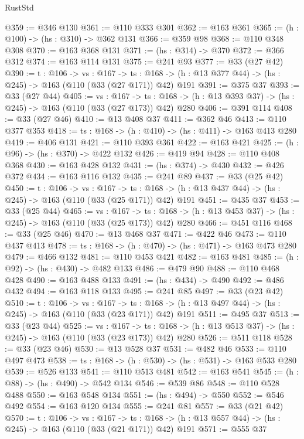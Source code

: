\begin{lexlean}{RustStd}
\begin{coremodule}
@359 := @346 @130
@361 := @110 @333 @301
@362 := @163 @361
@365 := (h : @100) -> (hs : @310) -> @362 @131
@366 := @359 @98
@368 := @110 @348 @308
@370 := @163 @368 @131
@371 := (hs : @314) -> @370
@372 := @366 @312
@374 := @163 @114 @131
@375 := @241 @93
@377 := @33 (@27 @42)
@390 := {t : @106} ->
  {vs : @167} ->
  {ts : @168} -> (h : @13 @377 @44) -> (hs : @245) -> @163 (@110 (@33 (@27 @171)) @42) @191
@391 := @375 @37
@393 := @33 (@27 @44)
@405 := {vs : @167} ->
  {ts : @168} -> (h : @13 @393 @37) -> (hs : @245) -> @163 (@110 (@33 (@27 @173)) @42) @280
@406 := @391 @114
@408 := @33 (@27 @46)
@410 := @13 @408 @37
@411 := @362 @46
@413 := @110 @377 @353
@418 := {ts : @168} -> (h : @410) -> (hs : @411) -> @163 @413 @280
@419 := @406 @131
@421 := @110 @393 @361
@422 := @163 @421
@425 := (h : @96) -> (hs : @370) -> @422 @132
@426 := @419 @94
@428 := @110 @408 @368
@430 := @163 @428 @132
@431 := (hs : @374) -> @430
@432 := @426 @372
@434 := @163 @116 @132
@435 := @241 @89
@437 := @33 (@25 @42)
@450 := {t : @106} ->
  {vs : @167} ->
  {ts : @168} -> (h : @13 @437 @44) -> (hs : @245) -> @163 (@110 (@33 (@25 @171)) @42) @191
@451 := @435 @37
@453 := @33 (@25 @44)
@465 := {vs : @167} ->
  {ts : @168} -> (h : @13 @453 @37) -> (hs : @245) -> @163 (@110 (@33 (@25 @173)) @42) @280
@466 := @451 @116
@468 := @33 (@25 @46)
@470 := @13 @468 @37
@471 := @422 @46
@473 := @110 @437 @413
@478 := {ts : @168} -> (h : @470) -> (hs : @471) -> @163 @473 @280
@479 := @466 @132
@481 := @110 @453 @421
@482 := @163 @481
@485 := (h : @92) -> (hs : @430) -> @482 @133
@486 := @479 @90
@488 := @110 @468 @428
@490 := @163 @488 @133
@491 := (hs : @434) -> @490
@492 := @486 @432
@494 := @163 @118 @133
@495 := @241 @85
@497 := @33 (@23 @42)
@510 := {t : @106} ->
  {vs : @167} ->
  {ts : @168} -> (h : @13 @497 @44) -> (hs : @245) -> @163 (@110 (@33 (@23 @171)) @42) @191
@511 := @495 @37
@513 := @33 (@23 @44)
@525 := {vs : @167} ->
  {ts : @168} -> (h : @13 @513 @37) -> (hs : @245) -> @163 (@110 (@33 (@23 @173)) @42) @280
@526 := @511 @118
@528 := @33 (@23 @46)
@530 := @13 @528 @37
@531 := @482 @46
@533 := @110 @497 @473
@538 := {ts : @168} -> (h : @530) -> (hs : @531) -> @163 @533 @280
@539 := @526 @133
@541 := @110 @513 @481
@542 := @163 @541
@545 := (h : @88) -> (hs : @490) -> @542 @134
@546 := @539 @86
@548 := @110 @528 @488
@550 := @163 @548 @134
@551 := (hs : @494) -> @550
@552 := @546 @492
@554 := @163 @120 @134
@555 := @241 @81
@557 := @33 (@21 @42)
@570 := {t : @106} ->
  {vs : @167} ->
  {ts : @168} -> (h : @13 @557 @44) -> (hs : @245) -> @163 (@110 (@33 (@21 @171)) @42) @191
@571 := @555 @37

\end{coremodule}
\end{lexlean}
